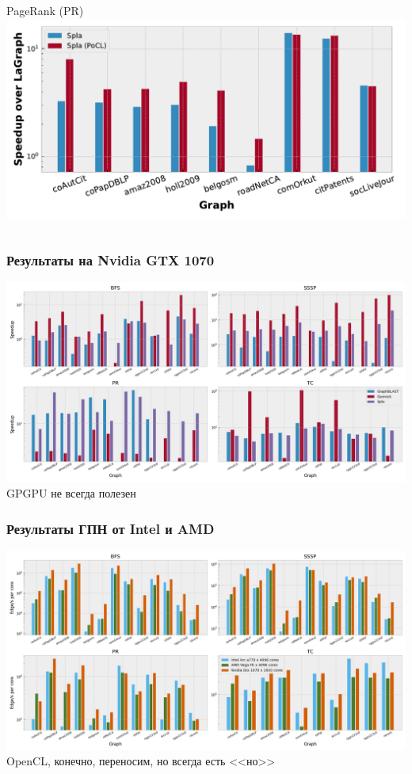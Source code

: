 \documentclass[xcolor=table,aspectratio=169]{beamer}
\begin{document}
\begin{frame}
\begin{columns}
\begin{center}
        PageRank (PR) \\
        \includegraphics[width=0.9\linewidth]{pictures/rq1_rel_pr.pdf}
        \end{center}
    \end{columns}
    
\end{frame}

\begin{frame}
  \frametitle{Результаты на Nvidia GTX 1070}
  \begin{center}
    \includegraphics[width=0.85\linewidth]{pictures/rq1_rel.png}
    \\
    GPGPU не всегда полезен
  \end{center}
\end{frame}

\begin{frame}
  \frametitle{Результаты ГПН от Intel и AMD}
  \begin{center}
    \includegraphics[width=0.85\linewidth]{pictures/rq2_cores.png}
    \\
    OpenCL, конечно, переносим, но всегда есть <<но>>
  \end{center}
\end{frame}
\end{document}
